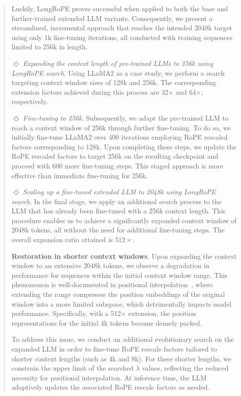 \begin{abstract}
Luckily, LongRoPE proves successful when applied to both the base and further-trained extended LLM variants. Consequently, we present a streamlined, incremental approach that reaches the intended 2048k target using only 1k fine-tuning iterations, all conducted with training sequences limited to 256k in length.

$\Diamond$ \textit{Expanding the context length of pre-trained LLMs to 256k using LongRoPE search}. Using LLaMA2 as a case study, we perform a search targeting context window sizes of 128k and 256k. The corresponding extension factors achieved during this process are 32$\times$ and 64$\times$, respectively.

$\Diamond$ \textit{Fine-tuning to 256k}. Subsequently, we adapt the pre-trained LLM to reach a context window of 256k through further fine-tuning. To do so, we initially fine-tune LLaMA2 over 400 iterations employing RoPE rescaled factors corresponding to 128k. Upon completing these steps, we update the RoPE rescaled factors to target 256k on the resulting checkpoint and proceed with 600 more fine-tuning steps. This staged approach is more effective than immediate fine-tuning for 256k.

$\Diamond$ \textit{Scaling up a fine-tuned extended LLM to 2048k using LongRoPE search}. In the final stage, we apply an additional search process to the LLM that has already been fine-tuned with a 256k context length. This procedure enables us to achieve a significantly expanded context window of 2048k tokens, all without the need for additional fine-tuning steps. The overall expansion ratio attained is $512\times$.

\textbf{Restoration in shorter context windows}.  Upon expanding the context window to an extensive 2048k tokens, we observe a degradation in performance for sequences within the initial context window range. This phenomenon is well-documented in positional interpolation~\cite{pi}, where extending the range compresses the position embeddings of the original window into a more limited subspace, which detrimentally impacts model performance. Specifically, with a 512$\times$ extension, the position representations for the initial 4k tokens become densely packed.

To address this issue, we conduct an additional evolutionary search on the expanded LLM in order to fine-tune RoPE rescale factors tailored to shorter context lengths (such as 4k and 8k). For these shorter lengths, we constrain the upper limit of the searched $\lambda$ values, reflecting the reduced necessity for positional interpolation. At inference time, the LLM adaptively updates the associated RoPE rescale factors as needed.


\end{abstract}
